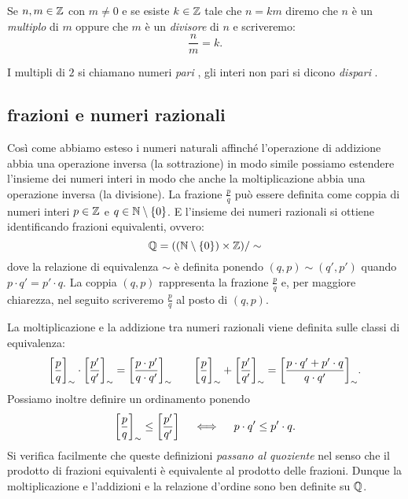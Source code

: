 Se $n,m\in{\mathbb Z}$ con $m\neq 0$ e 
%
se esiste $k\in{\mathbb Z}$ tale 
che $n=km$ diremo che $n$ è un \emph{multiplo}
di $m$ oppure che $m$ è un \emph{divisore}%
%
 di $n$
e scriveremo:
\[
  \frac{n}{m} = k.  
\]

I multipli di $2$ si chiamano numeri \emph{pari}%
%
,
gli interi non pari si dicono \emph{dispari}%
%
. 


\subsection{frazioni e numeri razionali}

Così come abbiamo esteso i numeri naturali affinché l'operazione di addizione abbia 
una operazione inversa (la sottrazione) in modo simile possiamo estendere l'insieme 
dei numeri interi in modo che anche la moltiplicazione abbia una operazione inversa 
(la divisione). 
La frazione $\frac p q$ può essere definita come coppia 
di numeri interi $p\in {\mathbb Z}$ e $q\in {\mathbb N}\setminus {\left\{ 0 \right\}}$. 
E l'insieme dei numeri razionali si ottiene identificando 
frazioni equivalenti, ovvero: 
\[
  {\mathbb Q} = (({\mathbb N} \setminus{\left\{ 0 \right\}})\times {\mathbb Z})/\sim  
\]
dove la relazione di equivalenza $\sim$ è definita ponendo 
$(q,p) \sim (q',p')$ quando $p\cdot q' = p'\cdot q$.
La coppia $(q,p)$ rappresenta la frazione $\frac p q$ e, 
per maggiore chiarezza, nel seguito scriveremo $\frac p q$ 
al posto di $(q,p)$.

%
La moltiplicazione e la addizione tra numeri razionali viene definita
sulle classi di equivalenza:
\[
 {\left[ \frac p q \right]}_\sim \cdot {\left[ \frac{p'}{q'} \right]}_\sim 
 = {\left[ \frac{p\cdot p'}{q\cdot q'} \right]}_\sim 
 \qquad 
 {\left[ \frac{p}{q} \right]}_\sim + {\left[ \frac{p'}{q'} \right]}_\sim 
 = {\left[ \frac{p\cdot q' + p'\cdot q}{q\cdot q'} \right]}_\sim.
\]
Possiamo inoltre definire un ordinamento ponendo
\[
 {\left[ \frac p q \right]}_\sim \le {\left[ \frac{p'}{q'} \right]}
 \quad\iff  \quad p \cdot q' \le p' \cdot q.
\]
Si verifica facilmente che queste definizioni \emph{passano al quoziente} 
nel senso che il prodotto di frazioni equivalenti è equivalente al prodotto 
delle frazioni. 
Dunque la moltiplicazione e l'addizioni 
e la relazione d'ordine sono ben definite su ${\mathbb Q}$.

